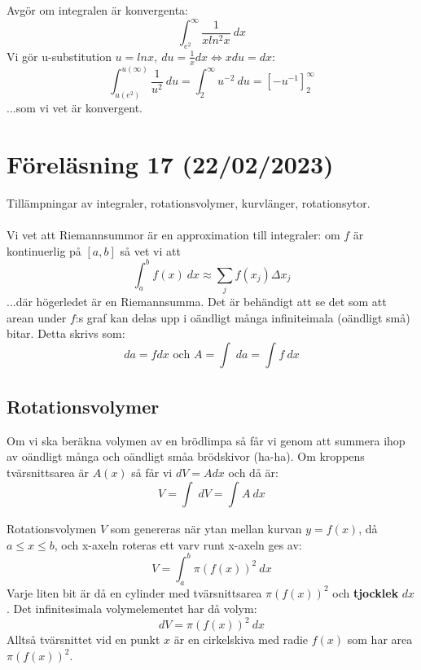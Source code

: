 \documentclass{report}
\begin{document}
\ex{}
{
Avgör om integralen är konvergenta:
\begin{equation*}
\int_{e^2}^{ \infty} \frac{1}{xln^2x}  \: dx 
\end{equation*}
Vi gör u-substitution $ u = lnx,\: du = \frac{1}{x} dx \iff x du = dx $:
\begin{equation*}
	\int_{u(e^2)}^{u( \infty)} \frac{1}{u^2}  \: du = \int_{2}^{ \infty} u^{-2} \: du = [-u^{-1}]_{2}^{ \infty}  
\end{equation*}
...som vi vet är konvergent.
}

\pagebreak
\section{Föreläsning 17 (22/02/2023)}
Tillämpningar av integraler, rotationsvolymer, kurvlänger, rotationsytor.\\\\

\noindent
Vi vet att Riemannsummor är en approximation till integraler: om $ f $ är kontinuerlig på $ [a,b] $ så vet vi att
\begin{equation*}
\int_{a}^{b} f(x) \: dx \approx \sum_{j}^{} f(x_j) \Delta x_j 	
\end{equation*}
...där högerledet är en Riemannsumma. Det är behändigt att se det som att arean under $ f $:s graf kan delas upp i oändligt många infiniteimala (oändligt små) bitar. Detta skrivs som:
\begin{equation*}
da = fdx \text{ och } A = \int_{}^{}  \: da = \int_{}^{} f \: dx  
\end{equation*}


\subsection{Rotationsvolymer}
Om vi ska beräkna volymen av en brödlimpa så får vi genom att summera ihop av oändligt många och oändligt småa brödskivor (ha-ha). Om kroppens tvärsnittsarea är $ A(x) $ så får vi $ dV = A dx $ och då är:
\begin{equation*}
V = \int_{}^{}  \: dV = \int_{}^{} A \: dx  
\end{equation*}

{
Rotationsvolymen $ V $ som genereras när ytan mellan kurvan $ y = f(x) $, då $ a \le x \le b $, och x-axeln roteras ett varv runt x-axeln ges av:
\begin{equation*}
V = \int_{a}^{b} \pi ( f(x))^2 \: dx 
\end{equation*}
Varje liten bit är då en cylinder med tvärsnittsarea $ \pi (f(x))^2 $ och \textbf{tjocklek} $ dx $. Det infinitesimala volymelementet har då volym:
\begin{equation*}
dV = \pi (f(x))^2\: dx
\end{equation*}
Alltså tvärsnittet vid en punkt $ x $ är en cirkelskiva med radie $ f(x) $ som har area $ \pi (f(x))^2 $. 
}
\end{document}
